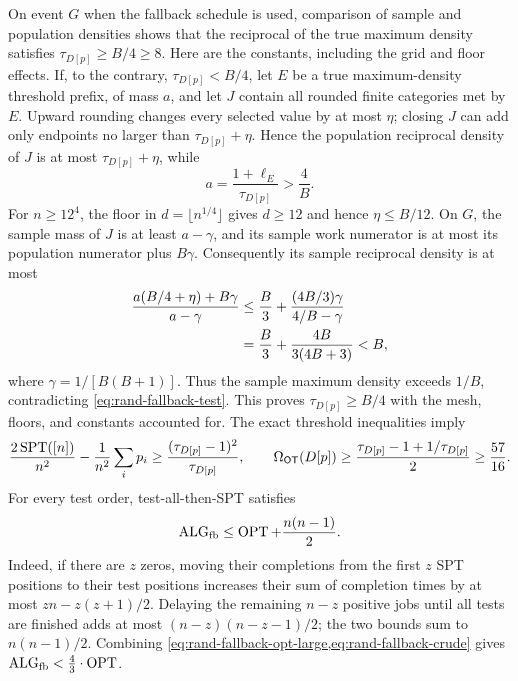 On event $G$ when the fallback schedule is used, comparison of sample and
population densities shows that the reciprocal of the true maximum density
satisfies
$\tau_{D[p]}\ge B/4\ge8$.
Here are the constants, including the grid and floor effects.  If, to the
contrary, $\tau_{D[p]}<B/4$, let $E$ be a true maximum-density threshold
prefix, of mass $a$, and let $J$ contain all rounded finite categories met
by $E$.  Upward rounding changes every selected value by at most $\eta$;
closing $J$ can add only endpoints no larger than
$\tau_{D[p]}+\eta$.  Hence the population reciprocal density of $J$ is at
most $\tau_{D[p]}+\eta$, while
\begin{equation}
 a=\frac{1+\ell_E}{\tau_{D[p]}}>\frac4B.
 \label{eq:rand-fallback-prefix-mass}
\end{equation}
For $n\ge12^4$, the floor in $d=\lfloor n^{1/4}\rfloor$ gives
$d\ge12$ and hence $\eta\le B/12$.  On $G$, the sample mass of $J$ is at
least $a-\gamma$, and its sample work numerator is at most its population
numerator plus $B\gamma$.  Consequently its sample reciprocal density is
at most
\begin{align}
 \frac{a(B/4+\eta)+B\gamma}{a-\gamma}
 &\le \frac B3+
   \frac{(4B/3)\gamma}{4/B-\gamma}
 \notag\\
 &=\frac B3+\frac{4B}{3(4B+3)}<B,
 \label{eq:rand-fallback-mesh-bridge}
\end{align}
where $\gamma=1/[B(B+1)]$.  Thus the sample maximum density exceeds
$1/B$, contradicting \cref{eq:rand-fallback-test}.  This proves
$\tau_{D[p]}\ge B/4$ with the mesh, floors, and constants accounted for.
The exact threshold inequalities imply
\begin{equation}
 \frac{2\operatorname{SPT}([n])}{n^2}-\frac1{n^2}\sum_i p_i
 \ge\frac{(\tau_{D[p]}-1)^2}{\tau_{D[p]}},
 \qquad
 \Omega_{\mathsf{OT}}(D[p])
 \ge\frac{\tau_{D[p]}-1+1/\tau_{D[p]}}{2}\ge\frac{57}{16}.
 \label{eq:rand-fallback-opt-large}
\end{equation}
For every test order, test-all-then-SPT satisfies
\begin{equation}
 \operatorname{ALG}_{\rm fb}\le\operatorname{OPT}+\frac{n(n-1)}2.
 \label{eq:rand-fallback-crude}
\end{equation}
Indeed, if there are $z$ zeros, moving their completions from the first $z$
SPT positions to their test positions increases their sum of completion
times by at most $zn-z(z+1)/2$.  Delaying the remaining $n-z$ positive jobs
until all tests are finished adds at most $(n-z)(n-z-1)/2$; the two bounds
sum to $n(n-1)/2$.  Combining
\cref{eq:rand-fallback-opt-large,eq:rand-fallback-crude} gives
$\operatorname{ALG}_{\rm fb}<\frac43\cdot\operatorname{OPT}$.


